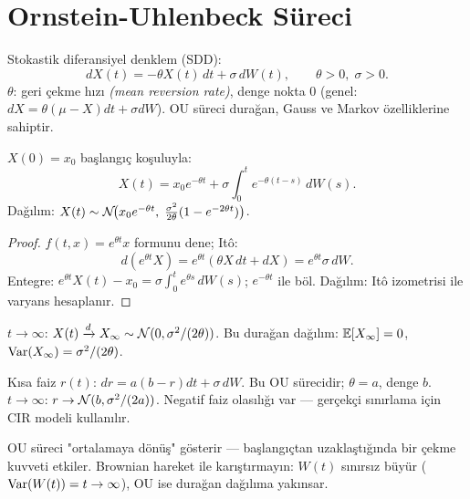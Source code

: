 \section{Ornstein-Uhlenbeck Süreci}
\label{sec:ou_sureci}

\begin{tanim}\label{def:ou}
Stokastik diferansiyel denklem (SDD):
\[
  dX(t) = -\theta X(t)\,dt + \sigma\,dW(t), \qquad \theta>0,\;\sigma>0.
\]
$\theta$: geri çekme hızı \emph{(mean reversion rate)}, denge nokta $0$ (genel: $dX=\theta(\mu-X)dt+\sigma dW$). OU süreci durağan, Gauss ve Markov özelliklerine sahiptir.
\end{tanim}

\begin{teorem}\label{thm:ou_cozum}
$X(0)=x_0$ başlangıç koşuluyla:
\[
  X(t) = x_0 e^{-\theta t} + \sigma\int_0^t e^{-\theta(t-s)}\,dW(s).
\]
Dağılım: $X(t)\sim\mathcal{N}\!\bigl(x_0 e^{-\theta t},\;\tfrac{\sigma^2}{2\theta}(1-e^{-2\theta t})\bigr)$.
\end{teorem}

\begin{proof}
$f(t,x)=e^{\theta t}x$ formunu dene; Itô:
\[
  d(e^{\theta t}X) = e^{\theta t}(\theta X\,dt + dX) = e^{\theta t}\sigma\,dW.
\]
Entegre: $e^{\theta t}X(t) - x_0 = \sigma\int_0^t e^{\theta s}\,dW(s)$; $e^{-\theta t}$ ile böl. Dağılım: Itô izometrisi ile varyans hesaplanır.
\end{proof}

\begin{teorem}\label{thm:ou_duraganlik}
$t\to\infty$: $X(t)\xrightarrow{d} X_\infty\sim\mathcal{N}(0,\sigma^2/(2\theta))$. Bu durağan dağılım: $\mathbb{E}[X_\infty]=0$, $\operatorname{Var}(X_\infty)=\sigma^2/(2\theta)$.
\end{teorem}

\begin{ornek}
Kısa faiz $r(t)$: $dr = a(b-r)dt + \sigma\,dW$. Bu OU sürecidir; $\theta=a$, denge $b$. $t\to\infty$: $r\to\mathcal{N}(b, \sigma^2/(2a))$. Negatif faiz olasılığı var --- gerçekçi sınırlama için CIR modeli kullanılır.
\end{ornek}

\begin{hataanalizi}
OU süreci "ortalamaya dönüş" gösterir --- başlangıçtan uzaklaştığında bir çekme kuvveti etkiler. Brownian hareket ile karıştırmayın: $W(t)$ sınırsız büyür ($\operatorname{Var}(W(t))=t\to\infty$), OU ise durağan dağılıma yakınsar.
\end{hataanalizi}

